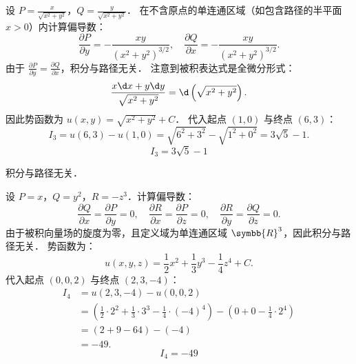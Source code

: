\begin{solution}
    设 $P = \frac{x}{\sqrt{x^2 + y^2}}$，$Q = \frac{y}{\sqrt{x^2 + y^2}}$．
    在不含原点的单连通区域（如包含路径的半平面 $x > 0$）内计算偏导数：
    \begin{equation}
        \label{eq:deriv-check-3}
        \frac{\partial P}{\partial y} = -\frac{xy}{(x^2 + y^2)^{3/2}}, \quad \frac{\partial Q}{\partial x} = -\frac{xy}{(x^2 + y^2)^{3/2}}.
    \end{equation}
    由于 $\frac{\partial P}{\partial y} = \frac{\partial Q}{\partial x}$，积分与路径无关．
    注意到被积表达式是全微分形式：
    \begin{equation}
        \frac{x \d x + y \d y}{\sqrt{x^2 + y^2}} = \d \left( \sqrt{x^2 + y^2} \right).
    \end{equation}
    因此势函数为 $u(x, y) = \sqrt{x^2 + y^2} + C$．
    代入起点 $(1,0)$ 与终点 $(6,3)$：
    \begin{equation}
        I_3 = u(6,3) - u(1,0) = \sqrt{6^2 + 3^2} - \sqrt{1^2 + 0^2} = 3\sqrt{5} - 1.
    \end{equation}
    \begin{equation}
        I_3 = \boxed{3\sqrt{5} - 1}
    \end{equation}

     积分与路径无关．

    设 $P = x$，$Q = y^2$，$R = -z^3$．计算偏导数：
    \begin{equation}
        \label{eq:deriv-check-4}
        \frac{\partial Q}{\partial x} = \frac{\partial P}{\partial y} = 0, \quad
        \frac{\partial R}{\partial x} = \frac{\partial P}{\partial z} = 0, \quad
        \frac{\partial R}{\partial y} = \frac{\partial Q}{\partial z} = 0.
    \end{equation}
    由于被积向量场的旋度为零，且定义域为单连通区域 $\symbb{R}^3$，因此积分与路径无关．
    势函数为：
    \begin{equation}
        u(x, y, z) = \frac{1}{2}x^2 + \frac{1}{3}y^3 - \frac{1}{4}z^4 + C.
    \end{equation}
    代入起点 $(0,0,2)$ 与终点 $(2,3,-4)$：
    \begin{equation}
        \begin{aligned}
            I_4 & = u(2,3,-4) - u(0,0,2)                                                                                                                   \\
                & = \left( \frac{1}{2} \cdot 2^2 + \frac{1}{3} \cdot 3^3 - \frac{1}{4} \cdot (-4)^4 \right) - \left( 0 + 0 - \frac{1}{4} \cdot 2^4 \right) \\
                & = (2 + 9 - 64) - (-4)                                                                                                                    \\
                & = -49.
        \end{aligned}
    \end{equation}
    \begin{equation}
        I_4 = \boxed{-49}
    \end{equation}


\end{solution}
